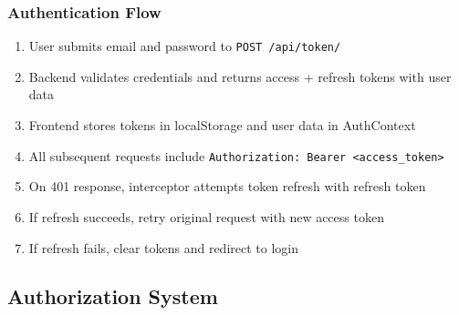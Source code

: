 \documentclass[11pt,a4paper]{article}
\begin{document}
\subsubsection{Authentication Flow}
\begin{enumerate}[leftmargin=*]
    \item User submits email and password to \texttt{POST /api/token/}
    \item Backend validates credentials and returns access + refresh tokens with user data
    \item Frontend stores tokens in localStorage and user data in AuthContext
    \item All subsequent requests include \texttt{Authorization: Bearer <access\_token>}
    \item On 401 response, interceptor attempts token refresh with refresh token
    \item If refresh succeeds, retry original request with new access token
    \item If refresh fails, clear tokens and redirect to login
\end{enumerate}

\subsection{Authorization System}
\end{document}
